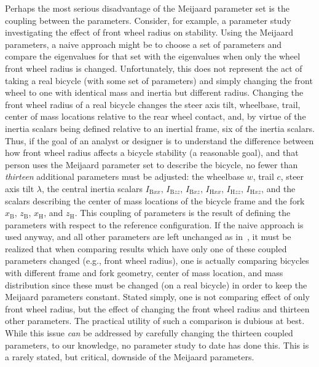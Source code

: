 Perhaps the most serious disadvantage of the Meijaard parameter set
is the coupling between the parameters. Consider, for example, a parameter
study investigating the effect of front wheel radius on stability.  Using the
Meijaard parameters, a naive approach might be to choose a set of parameters
and compare the eigenvalues for that set with the eigenvalues when only the
wheel front wheel radius is changed. Unfortunately, this does not represent the
act of taking a real bicycle (with some set of parameters) and simply changing
the front wheel to one with identical mass and inertia but different radius.
Changing the front wheel radius of a real bicycle changes the steer axis tilt,
wheelbase, trail, center of mass locations relative to the rear wheel contact,
and, by virtue of the inertia scalars being defined relative to an inertial
frame, six of the inertia scalars. Thus, if the goal of an analyst or designer
is to understand the difference between how front wheel radius affects a
bicycle stability (a reasonable goal), and that person uses the Meijaard
parameter set to describe the bicycle, no fewer than \textit{thirteen}
additional parameters must be adjusted: the wheelbase $w$, trail $c$, steer
axis tilt $\lambda$, the central inertia scalars $I_{\text{B}xx}$,
$I_{\text{B}zz}$, $I_{\text{B}xz}$, $I_{\text{H}xx}$, $I_{\text{H}zz}$,
$I_{\text{H}xz}$, and the scalars describing the center of mass locations of
the bicycle frame and the fork $x_\text{B}$, $z_\text{B}$, $x_\text{H}$, and
$z_\text{H}$. This coupling of parameters is the result of defining the
parameters with respect to the reference configuration. If the naive approach
is used anyway, and all other parameters are left unchanged as
in~\cite{Moore2008,Tak2010}, it must be realized that when comparing results
which have only one of these coupled parameters changed (e.g., front wheel
radius), one is actually comparing bicycles with different frame and fork
geometry, center of mass location, and mass distribution since these must be
changed (on a real bicycle) in order to keep the Meijaard parameters constant.
Stated simply, one is not comparing effect of only front wheel radius, but the
effect of changing the front wheel radius and thirteen other parameters. The
practical utility of such a comparison is dubious at best. While this issue
\textit{can} be addressed by carefully changing the thirteen coupled
parameters, to our knowledge, no parameter study to date has done this. This is
a rarely stated, but critical, downside of the Meijaard parameters.

